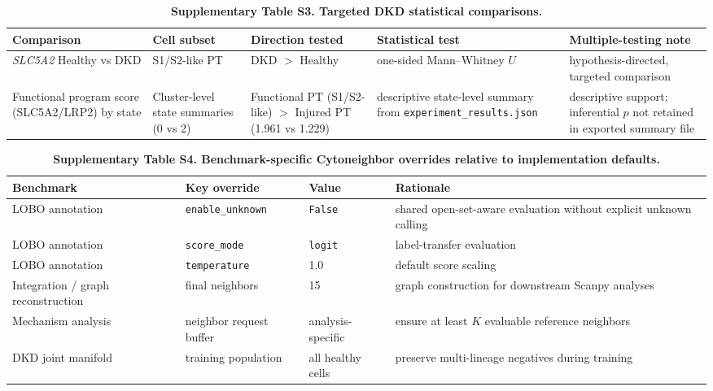 \documentclass[11pt]{article}
\begin{document}
\begin{table}[htbp]
\centering
\caption{\textbf{Supplementary Table S3. Targeted DKD statistical comparisons.}}
\label{tab:s3_dkd_stats}
\renewcommand{\arraystretch}{1.2}
\begin{tabular}{p{} p{} p{} p{} p{}}
\toprule
\textbf{Comparison} & \textbf{Cell subset} & \textbf{Direction tested} & \textbf{Statistical test} & \textbf{Multiple-testing note} \\
\midrule
\textit{SLC5A2} Healthy vs DKD & S1/S2-like PT & DKD $>$ Healthy & one-sided Mann--Whitney $U$ & hypothesis-directed, targeted comparison \\
Functional program score (SLC5A2/LRP2) by state & Cluster-level state summaries (0 vs 2) & Functional PT (S1/S2-like) $>$ Injured PT (1.961 vs 1.229) & descriptive state-level summary from \texttt{experiment\_results.json} & descriptive support; inferential $p$ not retained in exported summary file \\
\bottomrule
\end{tabular}
\end{table}

\begin{table}[htbp]
\centering
\caption{\textbf{Supplementary Table S4. Benchmark-specific Cytoneighbor overrides relative to implementation defaults.}}
\label{tab:s4_overrides}
\renewcommand{\arraystretch}{1.2}
\begin{tabular}{p{} p{} p{} p{}}
\toprule
\textbf{Benchmark} & \textbf{Key override} & \textbf{Value} & \textbf{Rationale} \\
\midrule
LOBO annotation & \texttt{enable\_unknown} & \texttt{False} & shared open-set-aware evaluation without explicit unknown calling \\
LOBO annotation & \texttt{score\_mode} & \texttt{logit} & label-transfer evaluation \\
LOBO annotation & \texttt{temperature} & 1.0 & default score scaling \\
Integration / graph reconstruction & final neighbors & 15 & graph construction for downstream Scanpy analyses \\
Mechanism analysis & neighbor request buffer & analysis-specific & ensure at least $K$ evaluable reference neighbors \\
DKD joint manifold & training population & all healthy cells & preserve multi-lineage negatives during training \\
\bottomrule
\end{tabular}
\end{table}
\end{document}
